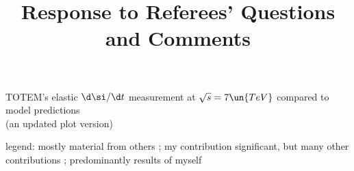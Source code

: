 \> TOTEM's elastic $\d\si/\d t$ measurement at $\sqrt s = 7\un{TeV}$ compared to model predictions\\
(an updated plot version)








\newpage%
\hbox{}\vfil
\title{Response to Referees' Questions and Comments}

\newpage%


\vskip-1mm
\> legend:
\cmyk{\cmykYellow}mostly material from others%
\cmyk{\cmykWhite};
\cmyk{\cmykGreen}my contribution significant, but many other contributions%
\cmyk{\cmykWhite};
\cmyk{\cmykRed} predominantly results of myself
\cmyk{\cmykWhite}

\vskip2mm

